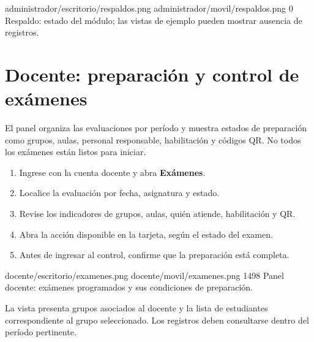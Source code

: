 \documentclass[11pt,a4paper]{article}
\begin{document}


\Pantallas
{administrador/escritorio/respaldos.png}
{administrador/movil/respaldos.png}
{0}
{Respaldo: estado del módulo; las vistas de ejemplo
pueden mostrar ausencia de registros.}

\section{Docente: preparación y control de exámenes}


El panel organiza las evaluaciones por período y muestra
estados de preparación como grupos, aulas, personal
responsable, habilitación y códigos QR.
No todos los exámenes están listos para iniciar.

\pasos
\begin{enumerate}
\item Ingrese con la cuenta docente y abra \textbf{Exámenes}.
\item Localice la evaluación por fecha, asignatura y estado.
\item Revise los indicadores de grupos, aulas, quién atiende,
habilitación y QR.
\item Abra la acción disponible en la tarjeta,
según el estado del examen.
\item Antes de ingresar al control, confirme
que la preparación está completa.
\end{enumerate}


\Pantallas
{docente/escritorio/examenes.png}
{docente/movil/examenes.png}
{1498}
{Panel docente: exámenes programados
y sus condiciones de preparación.}





La vista presenta grupos asociados al docente
y la lista de estudiantes correspondiente al grupo
seleccionado. Los registros deben consultarse
dentro del período pertinente.
\end{document}
